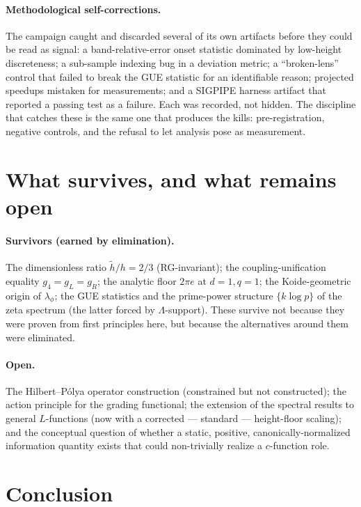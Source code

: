 \documentclass[11pt]{article}
\begin{document}
\paragraph{Methodological self-corrections.} The campaign caught and discarded several of
its own artifacts before they could be read as signal: a band-relative-error onset
statistic dominated by low-height discreteness; a sub-sample indexing bug in a deviation
metric; a ``broken-lens'' control that failed to break the GUE statistic for an
identifiable reason; projected speedups mistaken for measurements; and a SIGPIPE harness
artifact that reported a passing test as a failure. Each was recorded, not hidden. The
discipline that catches these is the same one that produces the kills: pre-registration,
negative controls, and the refusal to let analysis pose as measurement.

\section{What survives, and what remains open}

\paragraph{Survivors (earned by elimination).} The dimensionless ratio $\tilde h/h=2/3$
(RG-invariant); the coupling-unification equality $g_4=g_L=g_R$; the analytic floor
$2\pi e$ at $d=1,q=1$; the Koide-geometric origin of $\lambda_\phi$; the GUE statistics
and the prime-power structure $\{k\log p\}$ of the zeta spectrum (the latter forced by
$\Lambda$-support). These survive not because they were proven from first principles
here, but because the alternatives around them were eliminated.

\paragraph{Open.} The Hilbert--Pólya operator construction (constrained but not
constructed); the action principle for the grading functional; the extension of the
spectral results to general $L$-functions (now with a corrected --- standard ---
height-floor scaling); and the conceptual question of whether a static, positive,
canonically-normalized information quantity exists that could non-trivially realize a
$c$-function role.

\section{Conclusion}
\end{document}
